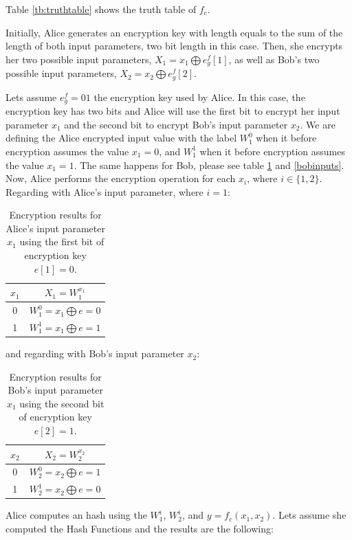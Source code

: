 \begin{refsection}
Table \ref{tb:truthtable} shows the truth table of $f_c$.

Initially, Alice generates an encryption key with length equals to the sum of the length of both input parameters, two bit length in this case. Then, she encrypts her two possible input parameters, $X_1 = x_1 \bigoplus e_g^f[1]$, as well as Bob's two possible input parameters, $X_2 = x_2 \bigoplus e_g^f[2]$. 

Lets assume $e_g^f = 01$ the encryption key used by Alice. In this case, the encryption key has two bits and Alice will use the first bit to encrypt her input parameter $x_1$ and the second bit to encrypt Bob's input parameter $x_2$. We are defining the Alice encrypted input value with the label $W_1^0$ when it before encryption assumes the value $x_1 = 0$, and $W_1^1$ when it before encryption assumes the value $x_1 = 1$. The same happens for Bob, please see table \ref{tb:aliceinputs} and \ref{bobinputs}.
Now, Alice performs the encryption operation for each $x_i$, where $i \in\{1,2\}$. Regarding with Alice's input parameter, where $i=1$:

\begin{table}[H]
\centering
\begin{tabular}{|c|c|}
\hline
$x_1$           & $X_1 = W_1^{x_1}$                             \\ \hline
0               & $W_1^0=x_1 \bigoplus e = 0$                   \\ \hline
1               & $W_1^1=x_1 \bigoplus e = 1$                   \\ \hline
\end{tabular}
\caption{Encryption results for Alice's input parameter $x_1$ using the first bit of encryption key $e[1]=0$.} \label{tb:aliceinputs}
\end{table}
and regarding with Bob's input parameter $x_2$:

\begin{table}[H]
\centering
\begin{tabular}{|c|c|}
\hline
$x_2$           & $X_2 = W_2^{x_2}$                             \\ \hline
0               & $W_2^0=x_2 \bigoplus e = 1$                   \\ \hline
1               & $W_2^1=x_2 \bigoplus e = 0$                   \\ \hline
\end{tabular}
\caption{Encryption results for Bob's input parameter $x_1$ using the second bit of encryption key $e[2]=1$.} \label{tb:bobinputs}
\end{table}
Alice computes an hash using the $W_1^i$, $W_2^i$, and $y=f_c(x_1, x_2)$. 
Lets assume she computed the Hash Functions and the results are the following:


\end{refsection}
